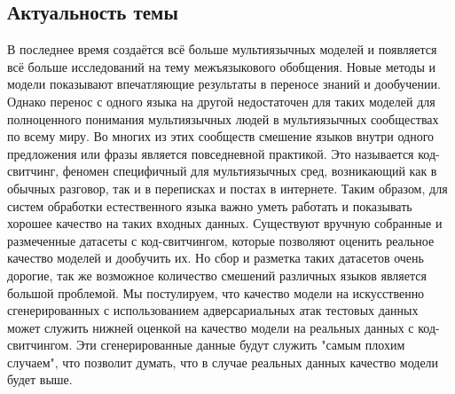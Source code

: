 \subsection{Актуальность темы}
В последнее время создаётся всё больше мультиязычных моделей и появляется всё больше исследований на тему межъязыкового обобщения.
Новые методы и модели показывают впечатляющие результаты в переносе знаний и дообучении.
Однако перенос с одного языка на другой недостаточен для таких моделей для полноценного понимания мультиязычных людей в мультиязычных сообществах по всему миру.
Во многих из этих сообществ смешение языков внутри одного предложения или фразы является повседневной практикой.
Это называется код-свитчинг, феномен специфичный для мультиязычных сред, возникающий как в обычных разговор, так и в переписках и постах в интернете.
Таким образом, для систем обработки естественного языка важно уметь работать и показывать хорошее качество на таких входных данных.
Существуют вручную собранные и размеченные датасеты с код-свитчингом, которые позволяют оценить реальное качество моделей и дообучить их.
Но сбор и разметка таких датасетов очень дорогие, так же возможное количество смешений различных языков является большой проблемой.
\newline
Мы постулируем, что качество модели на искусственно сгенерированных с использованием адверсариальных атак тестовых данных может служить нижней оценкой на качество модели на реальных данных с код-свитчингом.
Эти сгенерированные данные будут служить "самым плохим случаем", что позволит думать, что в случае реальных данных качество модели будет выше.
